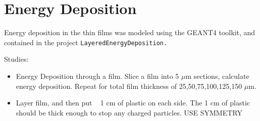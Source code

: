 \section{Energy Deposition}

Energy deposition in the thin films was modeled using the GEANT4 toolkit, and contained in the project \tt{LayeredEnergyDeposition}.


Studies:
\begin{itemize}
    \item Energy Deposition through a film. Slice a film into 5 $\mu$m sections, calculate energy deposition. Repeat for total film thickness of 25,50,75,100,125,150 $\mu$m.
    \item Layer film, and then put ~ 1 cm of plastic on each side. The 1 cm of plastic should be thick enough to stop any charged particles. USE SYMMETRY
\end{itemize}

